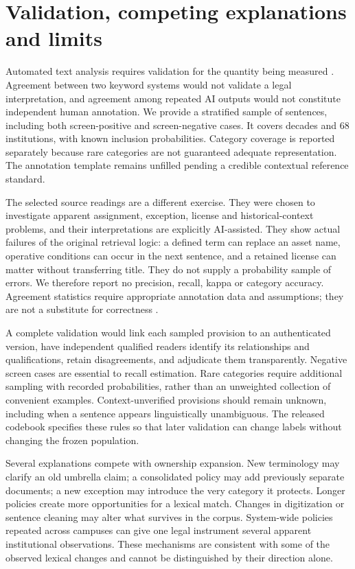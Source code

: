 \documentclass[12pt]{article}
\begin{document}
\section{Validation, competing explanations and limits}
Automated text analysis requires validation for the quantity being measured \citep{grimmer2013,gentzkow2019}. Agreement between two keyword systems would not validate a legal interpretation, and agreement among repeated AI outputs would not constitute independent human annotation. We provide a stratified sample of \ValidationN{} sentences, including both screen-positive and screen-negative cases. It covers decades and 68 institutions, with known inclusion probabilities. Category coverage is reported separately because rare categories are not guaranteed adequate representation. The annotation template remains unfilled pending a credible contextual reference standard.

The selected source readings are a different exercise. They were chosen to investigate apparent assignment, exception, license and historical-context problems, and their interpretations are explicitly AI-assisted. They show actual failures of the original retrieval logic: a defined term can replace an asset name, operative conditions can occur in the next sentence, and a retained license can matter without transferring title. They do not supply a probability sample of errors. We therefore report no precision, recall, kappa or category accuracy. Agreement statistics require appropriate annotation data and assumptions; they are not a substitute for correctness \citep{artstein2008}.

A complete validation would link each sampled provision to an authenticated version, have independent qualified readers identify its relationships and qualifications, retain disagreements, and adjudicate them transparently. Negative screen cases are essential to recall estimation. Rare categories require additional sampling with recorded probabilities, rather than an unweighted collection of convenient examples. Context-unverified provisions should remain unknown, including when a sentence appears linguistically unambiguous. The released codebook specifies these rules so that later validation can change labels without changing the frozen population.

Several explanations compete with ownership expansion. New terminology may clarify an old umbrella claim; a consolidated policy may add previously separate documents; a new exception may introduce the very category it protects. Longer policies create more opportunities for a lexical match. Changes in digitization or sentence cleaning may alter what survives in the corpus. System-wide policies repeated across campuses can give one legal instrument several apparent institutional observations. These mechanisms are consistent with some of the observed lexical changes and cannot be distinguished by their direction alone.
\end{document}
